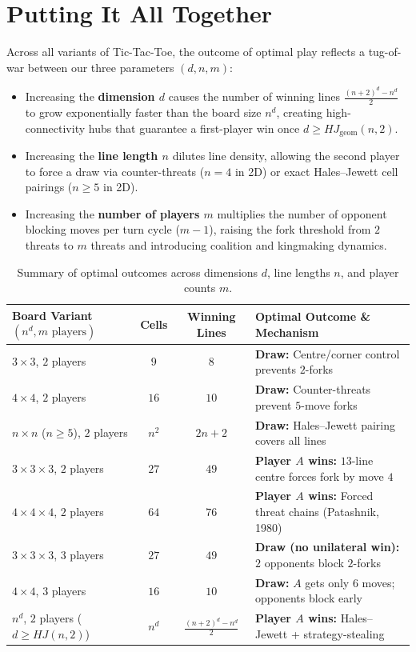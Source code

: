 \documentclass[11pt, a4paper]{article}
\begin{document}
\section{Putting It All Together}
Across all variants of Tic-Tac-Toe, the outcome of optimal play reflects a tug-of-war between our three parameters $(d, n, m)$:
\begin{itemize}
    \item Increasing the \textbf{dimension $d$} causes the number of winning lines $\frac{(n + 2)^d - n^d}{2}$ to grow exponentially faster than the board size $n^d$, creating high-connectivity hubs that guarantee a first-player win once $d \ge HJ_{\mathrm{geom}}(n, 2)$.
    \item Increasing the \textbf{line length $n$} dilutes line density, allowing the second player to force a draw via counter-threats ($n = 4$ in 2D) or exact Hales--Jewett cell pairings ($n \ge 5$ in 2D).
    \item Increasing the \textbf{number of players $m$} multiplies the number of opponent blocking moves per turn cycle ($m - 1$), raising the fork threshold from $2$ threats to $m$ threats and introducing coalition and kingmaking dynamics.
\end{itemize}

\begin{table}[htbp]
  \centering
  \caption{Summary of optimal outcomes across dimensions $d$, line lengths $n$, and player counts $m$.}
  \label{tab:summary_all}
  \begin{tabular}{@{}lccl@{}}
    \toprule
    Board Variant $(n^d, m\text{ players})$ & Cells & Winning Lines & Optimal Outcome \& Mechanism \\
    \midrule
    $3 \times 3$, $2$ players & $9$ & $8$ & \textbf{Draw:} Centre/corner control prevents $2$-forks \\
    $4 \times 4$, $2$ players & $16$ & $10$ & \textbf{Draw:} Counter-threats prevent $5$-move forks \\
    $n \times n$ ($n \ge 5$), $2$ players & $n^2$ & $2n + 2$ & \textbf{Draw:} Hales--Jewett pairing covers all lines \\
    $3 \times 3 \times 3$, $2$ players & $27$ & $49$ & \textbf{Player $A$ wins:} $13$-line centre forces fork by move $4$ \\
    $4 \times 4 \times 4$, $2$ players & $64$ & $76$ & \textbf{Player $A$ wins:} Forced threat chains (Patashnik, 1980) \\
    $3 \times 3 \times 3$, $3$ players & $27$ & $49$ & \textbf{Draw (no unilateral win):} $2$ opponents block $2$-forks \\
    $4 \times 4$, $3$ players & $16$ & $10$ & \textbf{Draw:} $A$ gets only $6$ moves; opponents block early \\
    $n^d$, $2$ players ($d \ge HJ(n, 2)$) & $n^d$ & $\frac{(n+2)^d - n^d}{2}$ & \textbf{Player $A$ wins:} Hales--Jewett + strategy-stealing \\
    \bottomrule
  \end{tabular}
\end{table}
\end{document}
